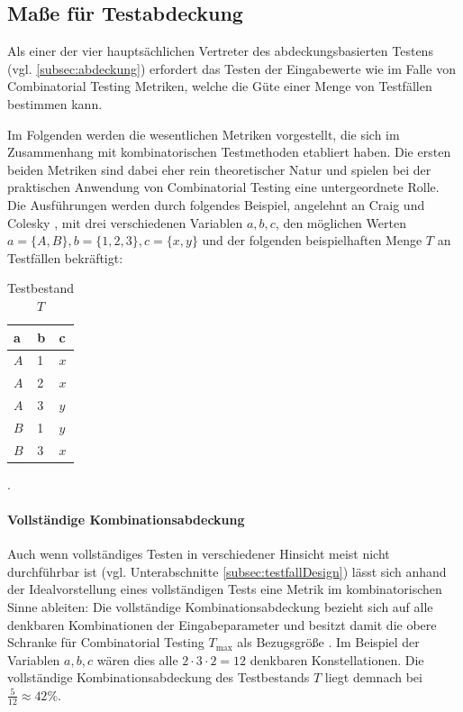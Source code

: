 \subsection{Maße für Testabdeckung}\label{subsec:masse}

Als einer der vier hauptsächlichen Vertreter des abdeckungsbasierten Testens (vgl. \autoref{subsec:abdeckung}) erfordert das Testen der Eingabewerte wie im Falle von Combinatorial Testing Metriken, welche die Güte einer Menge von Testfällen bestimmen kann.

Im Folgenden werden die wesentlichen Metriken vorgestellt, die sich im Zusammenhang mit kombinatorischen Testmethoden etabliert haben. Die ersten beiden Metriken sind dabei eher rein theoretischer Natur und spielen bei der praktischen Anwendung von Combinatorial Testing eine untergeordnete Rolle. Die Ausführungen werden durch folgendes Beispiel, angelehnt an Craig und Colesky \cite[S. 160 ff.]{craig2002systematic}, mit drei verschiedenen Variablen $a,b,c$, den möglichen Werten $a = \{A,B\}, b = \{1,2,3\}, c = \{x,y\}$ und der folgenden beispielhaften Menge $T$ an Testfällen bekräftigt:
\begin{table}[h!]
\begin{tabular}{|l|l|l|}
\cellcolor{grauinfo}a   & \cellcolor{grauinfo}b & \cellcolor{grauinfo}c   \\ \hline
$A$ & 1 & $x$ \\ \hline
$A$ & 2 & $x$ \\ \hline
$A$ & 3 & $y$ \\ \hline
$B$ & 1 & $y$ \\ \hline
$B$ & 3 & $x$ \\ \hline
\end{tabular}
\caption{Testbestand $T$}.
\label{tab:beispielMetrik}
\end{table}
 
\paragraph{Vollständige Kombinationsabdeckung}

Auch wenn vollständiges Testen in verschiedener Hinsicht meist nicht durchführbar ist (vgl. Unterabschnitte \ref{subsec:testfallDesign}) lässt sich anhand der Idealvorstellung eines vollständigen Tests eine Metrik im kombinatorischen Sinne ableiten: Die vollständige Kombinationsabdeckung bezieht sich auf alle denkbaren Kombinationen der Eingabeparameter und besitzt damit die obere Schranke für Combinatorial Testing $T_{\max}$ als Bezugsgröße \cite[S. 160]{craig2002systematic}. Im Beispiel der Variablen $a, b, c$ wären dies alle $2 \cdot 3 \cdot 2 = 12$ denkbaren Konstellationen. Die vollständige Kombinationsabdeckung des Testbestands $T$ liegt demnach bei $\frac{5}{12} \approx 42 \%$.

